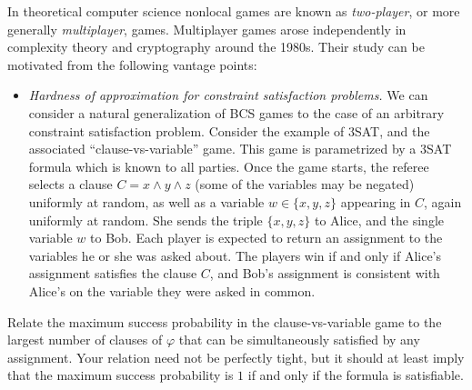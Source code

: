
In theoretical computer science nonlocal games are known as \emph{two-player}, or more generally \emph{multiplayer}, games. Multiplayer games arose independently in complexity theory and cryptography around the 1980s. 
Their study can be motivated from the following vantage points: 
\begin{itemize}
\item \emph{Hardness of approximation for constraint satisfaction problems.} We can consider a natural generalization of BCS games to the case of an arbitrary constraint satisfaction problem. Consider the example of $3$SAT, and the associated ``clause-vs-variable'' game. This game is parametrized by a $3$SAT formula which is known to all parties. Once the game starts, the referee selects a clause $C = x \wedge y \wedge z$ (some of the variables may be negated) uniformly at random, as well as a variable $w\in\{x,y,z\}$ appearing in $C$, again uniformly at random. She sends the triple $\{x,y,z\}$ to Alice, and the single variable $w$ to Bob. Each player is expected to return an assignment to the variables he or she was asked about. The players win if and only if Alice's assignment satisfies the clause $C$, and Bob's assignment is consistent with Alice's on the variable they were asked in common.\\
\end{itemize}

\begin{exercise}
Relate the maximum success probability in the clause-vs-variable game to the largest number of clauses of $\varphi$ that can be simultaneously satisfied by any assignment. Your relation need not be perfectly tight, but it should at least imply that the maximum success probability is $1$ if and only if the formula is satisfiable. 
\end{exercise}

